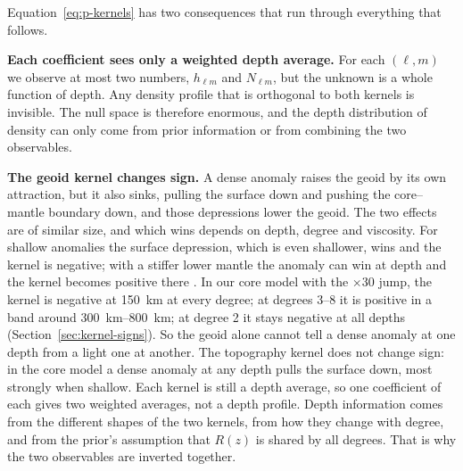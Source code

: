 Equation~\eqref{eq:p-kernels} has two consequences that run through everything that follows.

\textbf{Each coefficient sees only a weighted depth average.}
For each $(\ell,m)$ we observe at most two numbers, $h_{\ell m}$ and $N_{\ell m}$, but the unknown is a whole function of depth.
Any density profile that is orthogonal to both kernels is invisible.
The null space is therefore enormous, and the depth distribution of density can only come from prior information or from combining the two observables.

\textbf{The geoid kernel changes sign.}
A dense anomaly raises the geoid by its own attraction, but it also sinks, pulling the surface down and pushing the core--mantle boundary down, and those depressions lower the geoid.
The two effects are of similar size, and which wins depends on depth, degree and viscosity.
For shallow anomalies the surface depression, which is even shallower, wins and the kernel is negative; with a stiffer lower mantle the anomaly can win at depth and the kernel becomes positive there \citep{richards_geoid_1984,hager_lower_1985}.
In our core model with the $\times30$ jump, the kernel is negative at \qty{150}{km} at every degree; at degrees 3--8 it is positive in a band around \qtyrange{300}{800}{km}; at degree 2 it stays negative at all depths (Section~\ref{sec:kernel-signs}).
So the geoid alone cannot tell a dense anomaly at one depth from a light one at another.
The topography kernel does not change sign: in the core model a dense anomaly at any depth pulls the surface down, most strongly when shallow.
Each kernel is still a depth average, so one coefficient of each gives two weighted averages, not a depth profile.
Depth information comes from the different shapes of the two kernels, from how they change with degree, and from the prior's assumption that $R(z)$ is shared by all degrees.
That is why the two observables are inverted together.

